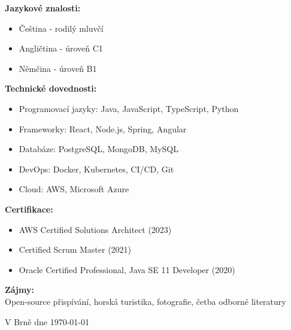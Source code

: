 \documentclass[a4paper,11pt]{article}
\begin{document}
\vspace{0.5cm}

\textbf{Jazykové znalosti:} \\
\begin{itemize}[leftmargin=*]
    \item Čeština - rodilý mluvčí
    \item Angličtina - úroveň C1
    \item Němčina - úroveň B1
\end{itemize}

\vspace{0.5cm}

\textbf{Technické dovednosti:} \\
\begin{itemize}[leftmargin=*]
    \item Programovací jazyky: Java, JavaScript, TypeScript, Python
    \item Frameworky: React, Node.js, Spring, Angular
    \item Databáze: PostgreSQL, MongoDB, MySQL
    \item DevOps: Docker, Kubernetes, CI/CD, Git
    \item Cloud: AWS, Microsoft Azure
\end{itemize}

\vspace{0.5cm}

\textbf{Certifikace:} \\
\begin{itemize}[leftmargin=*]
    \item AWS Certified Solutions Architect (2023)
    \item Certified Scrum Master (2021)
    \item Oracle Certified Professional, Java SE 11 Developer (2020)
\end{itemize}

\vspace{0.5cm}

\textbf{Zájmy:} \\
Open-source přispívání, horská turistika, fotografie, četba odborné literatury

\vspace{1cm}

V Brně dne \today
\end{document}
